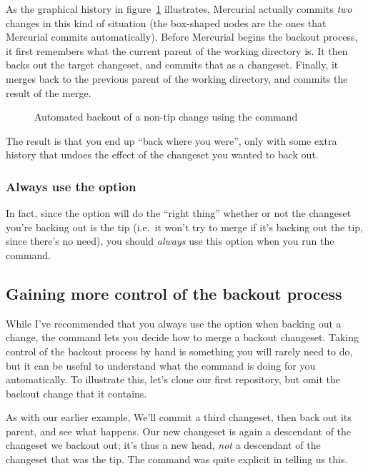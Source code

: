 As the graphical history in figure~\ref{fig:undo:backout-non-tip}
illustrates, Mercurial actually commits \emph{two} changes in this
kind of situation (the box-shaped nodes are the ones that Mercurial
commits automatically).  Before Mercurial begins the backout process,
it first remembers what the current parent of the working directory
is.  It then backs out the target changeset, and commits that as a
changeset.  Finally, it merges back to the previous parent of the
working directory, and commits the result of the merge.

\begin{figure}[htb]
  \centering
  \caption{Automated backout of a non-tip change using the  command}
  \label{fig:undo:backout-non-tip}
\end{figure}

The result is that you end up ``back where you were'', only with some
extra history that undoes the effect of the changeset you wanted to
back out.

\subsubsection{Always use the  option}

In fact, since the  option will do the ``right
thing'' whether or not the changeset you're backing out is the tip
(i.e.~it won't try to merge if it's backing out the tip, since there's
no need), you should \emph{always} use this option when you run the
 command.

\subsection{Gaining more control of the backout process}

While I've recommended that you always use the
 option when backing out a change, the
 command lets you decide how to merge a backout
changeset.  Taking control of the backout process by hand is something
you will rarely need to do, but it can be useful to understand what
the  command is doing for you automatically.  To
illustrate this, let's clone our first repository, but omit the
backout change that it contains.

As with our earlier example, We'll commit a third changeset, then back
out its parent, and see what happens.
Our new changeset is again a descendant of the changeset we backout
out; it's thus a new head, \emph{not} a descendant of the changeset
that was the tip.  The  command was quite explicit in
telling us this.

